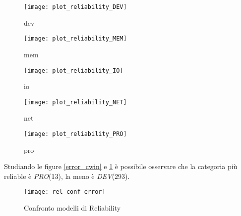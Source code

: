 \begin{minipage}{\linewidth}
  \centering
  \begin{minipage}{0.49\linewidth}
    \begin{figure}[H]
      \texttt{[image: plot\_reliability\_DEV]}
      \caption*{dev}
    \end{figure}
  \end{minipage}
  \begin{minipage}{0.49\linewidth}
    \begin{figure}[H]
      \texttt{[image: plot\_reliability\_MEM]}
      \caption*{mem}
    \end{figure}
  \end{minipage}
  \begin{minipage}{0.49\linewidth}
    \begin{figure}[H]
      \texttt{[image: plot\_reliability\_IO]}
      \caption*{io}
    \end{figure}
  \end{minipage}
  \begin{minipage}{0.49\linewidth}
    \begin{figure}[H]
      \texttt{[image: plot\_reliability\_NET]}
      \caption*{net}
    \end{figure}
  \end{minipage}
  \begin{minipage}{0.49\linewidth}
    \hspace{0.25\linewidth}
    \begin{figure}[H]
      \texttt{[image: plot\_reliability\_PRO]}
      \caption*{pro}
    \end{figure}
  \end{minipage}
\end{minipage}
\label{modello_reliability}

\clearpage

Studiando le figure \ref{error_cwin} e \ref{rel_models} è possibile osservare
che la categoria più reliable è \textit{PRO}(13), la meno è \textit{DEV}(293).\\

\begin{figure}[!htbp]
  \centering
  \texttt{[image: rel\_conf\_error]}
  \caption{Confronto modelli di Reliability}
  \label{rel_models}
\end{figure}

\clearpage

